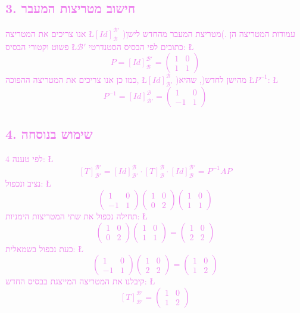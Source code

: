 \documentclass[english,hebrew]{article}
\begin{document}
\subsection*{\textcolor{violet}{3. חישוב מטריצות המעבר}}

\textcolor{violet}{אנו צריכים את המטריצה \L{$[Id]_{\mathcal{B}}^{\mathcal{B}'}$}
)מטריצת המעבר מהחדש לישן(. עמודות המטריצה הן פשוט וקטורי הבסיס \L{$\mathcal{B}'$}
כתובים לפי הבסיס הסטנדרטי: \L{%
\[
P=[Id]_{\mathcal{B}}^{\mathcal{B}'}=\begin{pmatrix}1 & 0\\
1 & 1
\end{pmatrix}
\]
}%
כמו כן אנו צריכים את המטריצה ההפוכה, \L{$[Id]_{\mathcal{B}'}^{\mathcal{B}}$}
)מהישן לחדש(, שהיא \L{$P^{-1}$}: \L{%
\[
P^{-1}=[Id]_{\mathcal{B}'}^{\mathcal{B}}=\begin{pmatrix}1 & 0\\
-1 & 1
\end{pmatrix}
\]
}%
}

\subsection*{\textcolor{violet}{4. שימוש בנוסחה}}

\textcolor{violet}{לפי טענה 4: \L{%
\[
[T]_{\mathcal{B}'}^{\mathcal{B}'}=[Id]_{\mathcal{B}'}^{\mathcal{B}}\cdot[T]_{\mathcal{B}}^{\mathcal{B}}\cdot[Id]_{\mathcal{B}}^{\mathcal{B}'}=P^{-1}AP
\]
}%
נציב ונכפול: \L{%
\[
\begin{pmatrix}1 & 0\\
-1 & 1
\end{pmatrix}\begin{pmatrix}1 & 0\\
0 & 2
\end{pmatrix}\begin{pmatrix}1 & 0\\
1 & 1
\end{pmatrix}
\]
}%
תחילה נכפול את שתי המטריצות הימניות: \L{%
\[
\begin{pmatrix}1 & 0\\
0 & 2
\end{pmatrix}\begin{pmatrix}1 & 0\\
1 & 1
\end{pmatrix}=\begin{pmatrix}1 & 0\\
2 & 2
\end{pmatrix}
\]
}%
כעת נכפול בשמאלית: \L{%
\[
\begin{pmatrix}1 & 0\\
-1 & 1
\end{pmatrix}\begin{pmatrix}1 & 0\\
2 & 2
\end{pmatrix}=\begin{pmatrix}1 & 0\\
1 & 2
\end{pmatrix}
\]
}%
קיבלנו את המטריצה המייצגת בבסיס החדש: \L{%
\[
[T]_{\mathcal{B}'}^{\mathcal{B}'}=\begin{pmatrix}1 & 0\\
1 & 2
\end{pmatrix}
\]
}%
}
\end{document}

